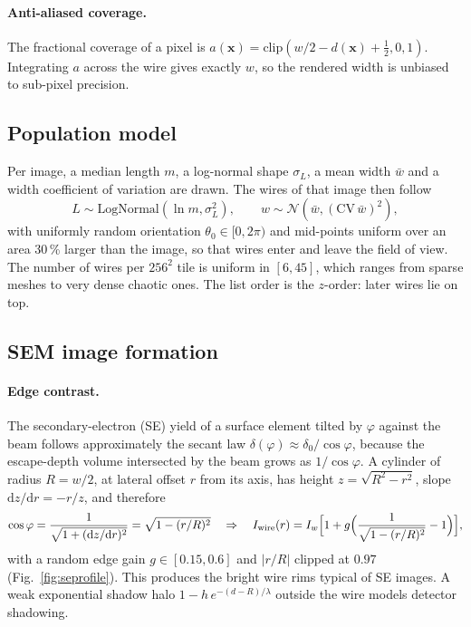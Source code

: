 \documentclass[11pt,a4paper]{article}
\begin{document}
\paragraph{Anti-aliased coverage.} The fractional coverage of a pixel is $a(\mathbf x)=\mathrm{clip}(w/2-d(\mathbf x)+\tfrac12,0,1)$. Integrating $a$ across the wire gives exactly $w$, so the rendered width is unbiased to sub-pixel precision.

\subsection{Population model}
Per image, a median length $m$, a log-normal shape $\sigma_L$, a mean width $\bar w$ and a width coefficient of variation are drawn. The wires of that image then follow
\begin{equation}
L\sim\mathrm{LogNormal}(\ln m,\sigma_L^2),\qquad w\sim\mathcal N(\bar w,(\mathrm{CV}\,\bar w)^2),
\end{equation}
with uniformly random orientation $\theta_0\in[0,2\pi)$ and mid-points uniform over an area 30\,\% larger than the image, so that wires enter and leave the field of view. The number of wires per $256^2$ tile is uniform in $[6,45]$, which ranges from sparse meshes to very dense chaotic ones. The list order is the $z$-order: later wires lie on top.

\subsection{SEM image formation}
\paragraph{Edge contrast.} The secondary-electron (SE) yield of a surface element tilted by $\varphi$ against the beam follows approximately the secant law $\delta(\varphi)\approx\delta_0/\cos\varphi$, because the escape-depth volume intersected by the beam grows as $1/\cos\varphi$. A cylinder of radius $R=w/2$, at lateral offset $r$ from its axis, has height $z=\sqrt{R^2-r^2}$, slope $\mathrm dz/\mathrm dr=-r/z$, and therefore
\begin{equation}
\cos\varphi=\frac1{\sqrt{1+(\mathrm dz/\mathrm dr)^2}}=\sqrt{1-(r/R)^2}
\quad\Rightarrow\quad
I_{\text{wire}}(r)=I_w\Bigl[1+g\Bigl(\frac1{\sqrt{1-(r/R)^2}}-1\Bigr)\Bigr],
\end{equation}
with a random edge gain $g\in[0.15,0.6]$ and $|r/R|$ clipped at $0.97$ (Fig.~\ref{fig:seprofile}). This produces the bright wire rims typical of SE images. A weak exponential shadow halo $1-h\,e^{-(d-R)/\lambda}$ outside the wire models detector shadowing.
\end{document}
